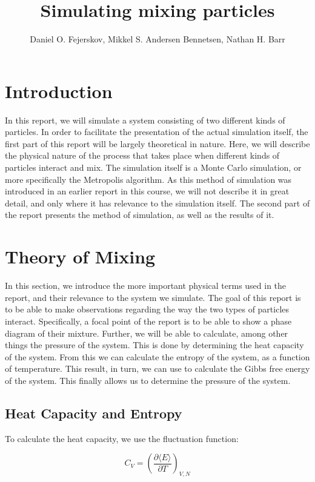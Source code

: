 \documentclass[12pt,a4paper]{report}
\begin{document}
\title{Simulating mixing particles}
\author{Daniel O. Fejerskov, Mikkel S. Andersen Bennetsen, Nathan H. Barr}
\maketitle
\tableofcontents

\chapter{Introduction}
In this report, we will simulate a system consisting of two different kinds of particles. In order to facilitate the presentation of the actual simulation itself, the first part of this report will be largely theoretical in nature. Here, we will describe the physical nature of the process that takes place when different kinds of particles interact and mix. The simulation itself is a Monte Carlo simulation, or more specifically the Metropolis algorithm. As this method of simulation was introduced in an earlier report in this course, we will not describe it in great detail, and only where it has relevance to the simulation itself. The second part of the report presents the method of simulation, as well as the results of it.

\chapter{Theory of Mixing}
In this section, we introduce the more important physical terms used in the report, and their relevance to the system we simulate. The goal of this report is to be able to make observations regarding the way the two types of particles interact. Specifically, a focal point of the report is to be able to show a phase diagram of their mixture. Further, we will be able to calculate, among other things the pressure of the system. This is done by determining the heat capacity of the system. From this we can calculate the entropy of the system, as a function of temperature. This result, in turn, we can use to calculate the Gibbs free energy of the system. This finally allows us to determine the pressure of the system.

\section{Heat Capacity and Entropy}
To calculate the heat capacity, we use the fluctuation function:

\begin{equation}
C_V = \left( \frac{\partial \langle E \rangle}{\partial T} \right)_{V,N}
\end{equation}
\end{document}
